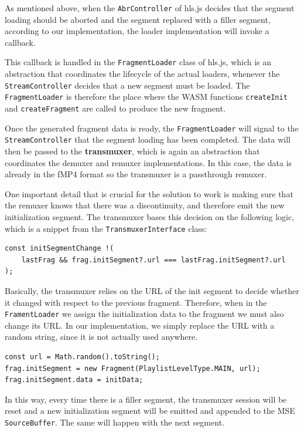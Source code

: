 As mentioned above, when the \texttt{AbrController} of hls.js decides that the segment loading should be aborted and the segment replaced with a filler segment, according to our implementation, the loader implementation will invoke a callback.

This callback is handled in the \texttt{FragmentLoader} class of hls.js, which is an abstraction that coordinates the lifecycle of the actual loaders, whenever the \texttt{StreamController} decides that a new segment must be loaded. The \texttt{FragmentLoader} is therefore the place where the WASM functions \texttt{createInit} and \texttt{createFragment} are called to produce the new fragment.

Once the generated fragment data is ready, the \texttt{FragmentLoader} will signal to the \texttt{StreamController} that the segment loading has been completed. The data will then be passed to the \textbf{transmuxer}, which is again an abstraction that coordinates the demuxer and remuxer implementations. In this case, the data is already in the fMP4 format so the transmuxer is a passthrough remuxer.

One important detail that is crucial for the solution to work is making sure that the remuxer knows that there was a discontinuity, and therefore emit the new initialization segment. The transmuxer bases this decision on the following logic, which is a snippet from the \texttt{TransmuxerInterface} class:

\begin{verbatim}
const initSegmentChange !(
    lastFrag && frag.initSegment?.url === lastFrag.initSegment?.url
);
\end{verbatim}

Basically, the transmuxer relies on the URL of the init segment to decide whether it changed with respect to the previous fragment. Therefore, when in the \texttt{FramentLoader} we assign the initialization data to the fragment we must also change its URL. In our implementation, we simply replace the URL with a random string, since it is not actually used anywhere.

\begin{verbatim}
const url = Math.random().toString();
frag.initSegment = new Fragment(PlaylistLevelType.MAIN, url);
frag.initSegment.data = initData;
\end{verbatim}

In this way, every time there is a filler segment, the transmuxer session will be reset and a new initialization segment will be emitted and appended to the MSE \texttt{SourceBuffer}. The same will happen with the next segment.

